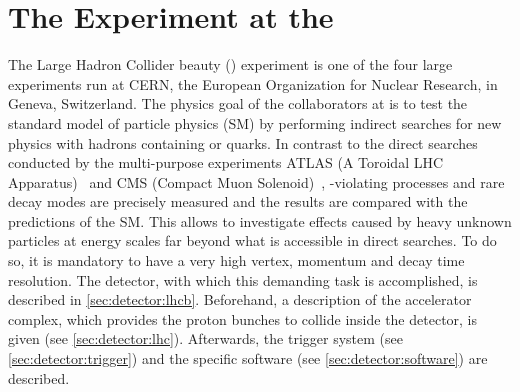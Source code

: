 
\chapter{The \lhcb Experiment at the \lhc}
\label{sec:Detector}

The Large Hadron Collider beauty (\lhcb) experiment is one of the four large
experiments run at CERN, the European Organization for Nuclear Research, in
Geneva, Switzerland. The physics goal of the collaborators at \lhcb is to test
the standard model of particle physics (SM) by performing indirect searches
for new physics with hadrons containing \bquark or \cquark quarks. In contrast
to the direct searches conducted by the multi-purpose experiments ATLAS (A
Toroidal LHC Apparatus)~\cite{ATLAS} and CMS (Compact Muon
Solenoid)~\cite{CMS}, \CP-violating processes and rare decay modes are
precisely measured and the results are compared with the predictions of the
SM. This allows to investigate effects caused by heavy unknown particles at
energy scales far beyond what is accessible in direct searches. To do so, it is
mandatory to have a very high vertex, momentum and decay time resolution. The
detector, with which this demanding task is accomplished, is described in
\cref{sec:detector:lhcb}. Beforehand, a description of the accelerator
complex, which provides the proton bunches to collide inside the detector, is
given (see \cref{sec:detector:lhc}). Afterwards, the trigger system (see
\cref{sec:detector:trigger}) and the specific software (see
\cref{sec:detector:software}) are described.







